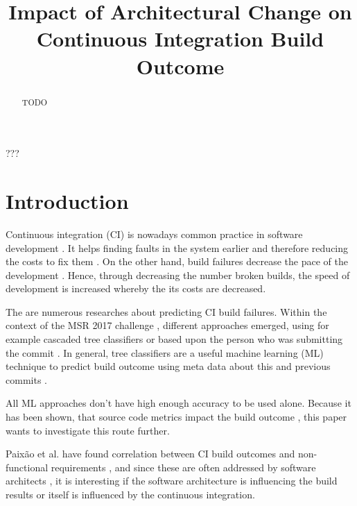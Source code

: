 \documentclass[conference]{IEEEtran}
\begin{document}
\title{Impact of Architectural Change on
	Continuous Integration Build Outcome\\
}

\author{
}

\maketitle

\begin{abstract}
TODO
\end{abstract}

\begin{IEEEkeywords}
???
\end{IEEEkeywords}

\section{Introduction}

Continuous integration (CI) is nowadays common practice in software development \cite{CI-Common}. It helps finding faults in the system earlier and therefore reducing the costs to fix them \cite{NutzenCI}. On the other hand, build failures decrease the pace of the development \cite{Costs-BuildFailures}. Hence, through decreasing the number broken builds, the speed of development is increased whereby the its costs are decreased.

The are numerous researches about predicting CI build failures. Within the context of the MSR 2017 challenge \cite{TravisTorrent},  different approaches emerged, using for example cascaded tree classifiers \cite{Pred-Cascade} or based upon the person who was submitting the commit \cite{ContrInvolv}. In general, tree classifiers are a useful machine learning (ML) technique to predict build outcome using meta data about this and previous commits \cite{Pred-Tree, ML-Project}. 

All ML approaches don't have high enough accuracy to be used alone. Because it has been shown, that source code metrics impact the build outcome \cite{FailsCorr}, this paper wants to investigate this route further. 

Paixão et al. have found correlation between CI build outcomes and non-functional requirements \cite{Fail-NFReq}, and since these are often addressed by software architects \cite{NFR-Architects}, it is interesting if the software architecture is influencing the build results or itself is influenced by the continuous integration. 
\end{document}
